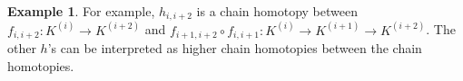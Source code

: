 \documentclass[a4paper]{amsart}
\numberwithin{figure}{section}
\theoremstyle{theorem}
\theoremstyle{definition}
\newtheorem{exam}[thm]{Example}
\begin{document}
\begin{exam}
For example, $h_{i,i{+}2}$ is a chain homotopy between $f_{i,i{+}2}: K^{(i)} \to K^{(i{+}2)}$ and $f_{i{+}1,i{+}2} \circ f_{i,i{+}1}: K^{(i)} \to K^{(i{+}1)} \to K^{(i{+}2)}$. The other $h$'s can be interpreted as higher chain homotopies between the chain homotopies.

\end{exam}
\end{document}
